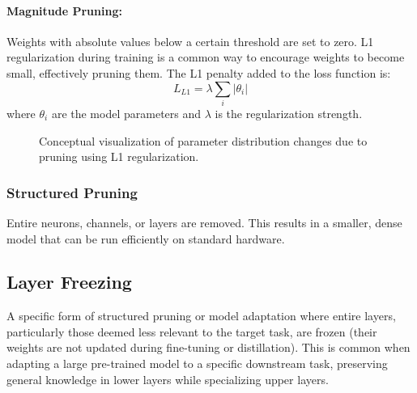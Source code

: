 \documentclass{article}
\begin{document}
\paragraph{Magnitude Pruning:} Weights with absolute values below a certain threshold are set to zero. L1 regularization during training is a common way to encourage weights to become small, effectively pruning them. The L1 penalty added to the loss function is:
$$ L_{L1} = \lambda \sum_i |\theta_i| $$
where $\theta_i$ are the model parameters and $\lambda$ is the regularization strength.

\begin{figure}[h!]
\centering
\caption{Conceptual visualization of parameter distribution changes due to pruning using L1 regularization.}
\label{fig:param_dist}
\end{figure}

\subsubsection{Structured Pruning}
Entire neurons, channels, or layers are removed. This results in a smaller, dense model that can be run efficiently on standard hardware.

\subsection{Layer Freezing}
A specific form of structured pruning or model adaptation where entire layers, particularly those deemed less relevant to the target task, are frozen (their weights are not updated during fine-tuning or distillation). This is common when adapting a large pre-trained model to a specific downstream task, preserving general knowledge in lower layers while specializing upper layers.
\end{document}
